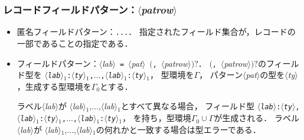 \documentclass{jbook}
\newcommand{\txt}[2]{#2}
\newcommand{\smlsharp}{SML\#}
\newcommand{\code}[1]{\mbox{\large\tt #1}}
\newcommand{\nonterm}[1]{\mbox{$\langle$}{\it #1}\mbox{$\rangle$}}
\newcommand{\term}[1]{\mbox{{\tt #1}}}
\newcommand{\optional}[1]{\mbox{$($}{\protect #1}\mbox{$)?$}}
\newcommand{\ass}{\Gamma}
\begin{document}
\subsubsection{レコードフィールドパターン：\nonterm{patrow}}

\begin{itemize}
\item 匿名フィールドパターン：\term{...}．
	指定されたフィールド集合が，レコードの一部であることの指定である．
\item フィールドパターン：\nonterm{lab}\ \term{=}\ \nonterm{pat}\ \optional{\term{,}\ \nonterm{patrow}}．
	\optional{\term{,}\ \nonterm{patrow}}のフィールド型を
\code{\nonterm{lab}$_1$:\nonterm{ty}$_1$,$\ldots$,\nonterm{lab}$_1$:\nonterm{ty}$_1$}，
型環境を$\ass$，
パターン\nonterm{pat}の型を\nonterm{ty}，生成する型環境を$\ass_0$とする．

	ラベル\nonterm{lab}が
\nonterm{lab}$_1$,$\ldots$,\nonterm{lab}$_1$とすべて異なる場合，
フィールド型
\code{\nonterm{lab}:\nonterm{ty},\nonterm{lab}$_1$:\nonterm{ty}$_1$,$\ldots$,\nonterm{lab}$_1$:\nonterm{ty}$_1$}，
を持ち，型環境$\ass_0 \cup \ass$が生成される．
	ラベル\nonterm{lab}が
\nonterm{lab}$_1$,$\ldots$,\nonterm{lab}$_1$の何れかと一致する場合は型エラーである．
\end{itemize}	

\section{\txt{\smlsharp{}に埋め込まれた問い合わせ言語SQLの構造}{}}
\end{document}
